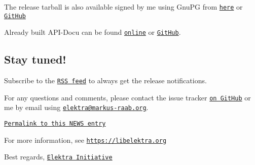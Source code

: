 The release tarball is also available signed by me using Gnu\+PG from \href{https://www.libelektra.org/ftp/elektra/releases/elektra-0.8.22.tar.gz.gpg}{\tt here} or \href{https://github.com/ElektraInitiative/ftp/blob/master/releases//elektra-0.8.22.tar.gz.gpg?raw=true}{\tt Git\+Hub}

Already built A\+P\+I-\/\+Docu can be found \href{https://doc.libelektra.org/api/0.8.22/html/}{\tt online} or \href{https://github.com/ElektraInitiative/doc/tree/master/api/0.8.22}{\tt Git\+Hub}.

\subsection*{Stay tuned!}

Subscribe to the \href{https://www.libelektra.org/news/feed.rss}{\tt R\+SS feed} to always get the release notifications.

For any questions and comments, please contact the issue tracker \href{http://issues.libelektra.org}{\tt on Git\+Hub} or me by email using \href{mailto:elektra@markus-raab.org}{\tt elektra@markus-\/raab.\+org}.

\href{https://www.libelektra.org/news/0.8.22-release}{\tt Permalink to this N\+E\+WS entry}

For more information, see \href{https://libelektra.org}{\tt https\+://libelektra.\+org}

Best regards, \href{https://www.libelektra.org/developers/authors}{\tt Elektra Initiative} 